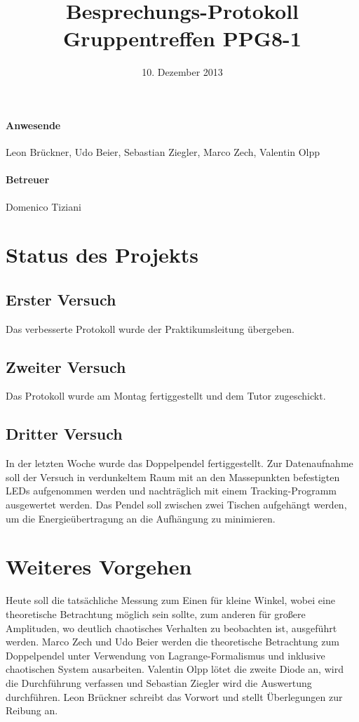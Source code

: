\documentclass[
]{scrartcl}
\begin{document}
\title{Besprechungs-Protokoll Gruppentreffen PPG8-1}
\date{10. Dezember 2013}
\maketitle

\paragraph*{Anwesende}
Leon Brückner,
Udo Beier,
Sebastian Ziegler,
Marco Zech,
Valentin Olpp
\paragraph*{Betreuer}
Domenico Tiziani


\section{Status des Projekts}

\subsection{Erster Versuch}
Das verbesserte Protokoll wurde der Praktikumsleitung übergeben. 

\subsection{Zweiter Versuch}
Das Protokoll wurde am Montag fertiggestellt und dem Tutor zugeschickt. 

\subsection{Dritter Versuch}
In der letzten Woche wurde das Doppelpendel fertiggestellt. Zur Datenaufnahme soll der Versuch in verdunkeltem Raum mit an den Massepunkten befestigten LEDs aufgenommen werden und nachträglich mit einem Tracking-Programm ausgewertet werden. Das Pendel soll zwischen zwei Tischen aufgehängt werden, um die Energieübertragung an die Aufhängung zu minimieren. 

\section{Weiteres Vorgehen}
Heute soll die tatsächliche Messung zum Einen für kleine Winkel, wobei eine theoretische Betrachtung möglich sein sollte, zum anderen für großere Amplituden, wo deutlich chaotisches Verhalten zu beobachten ist, ausgeführt werden. Marco Zech und Udo Beier werden die theoretische Betrachtung zum Doppelpendel unter Verwendung von Lagrange-Formalismus und inklusive chaotischen System ausarbeiten. Valentin Olpp lötet die zweite Diode an, wird die Durchführung verfassen und Sebastian Ziegler wird die Auswertung durchführen. Leon Brückner schreibt das Vorwort und stellt Überlegungen zur Reibung an. 
\end{document}
